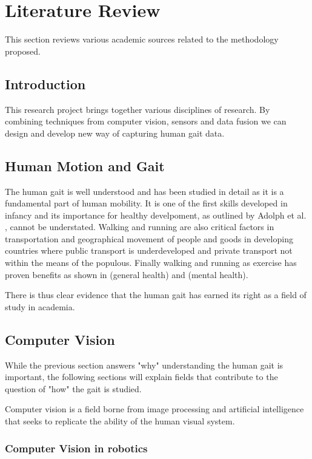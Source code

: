 \chapter{Literature Review}
This section reviews various academic sources related to the methodology proposed.

\section{Introduction}
This research project brings together various disciplines of research. By combining techniques from computer vision, sensors and data fusion we can design and develop new way of capturing human gait data. 

\section{Human Motion and Gait}
The human gait is well understood and has been studied in detail as it is a fundamental part of human mobility. It is one of the first skills developed in infancy and its importance for healthy develpoment, as outlined by Adolph et al. \cite{adolph2013road}, cannot be understated. Walking and running are also critical factors in transportation and geographical movement of people and goods in developing countries where public transport is underdeveloped and private transport not within the means of the populous. Finally walking and running as exercise has proven benefits as shown in \cite{hanson2015there} (general health) and \cite{fox1999influence} (mental health).     

There is thus clear evidence that the human gait has earned its right as a field of study in academia.

\section{Computer Vision}
While the previous section answers "why" understanding the human gait is important, the following sections will explain fields that contribute to the question of "how" the gait is studied.

Computer vision is a field borne from image processing and artificial intelligence that seeks to replicate the ability of the human visual system.   


\subsection{Computer Vision in robotics}

